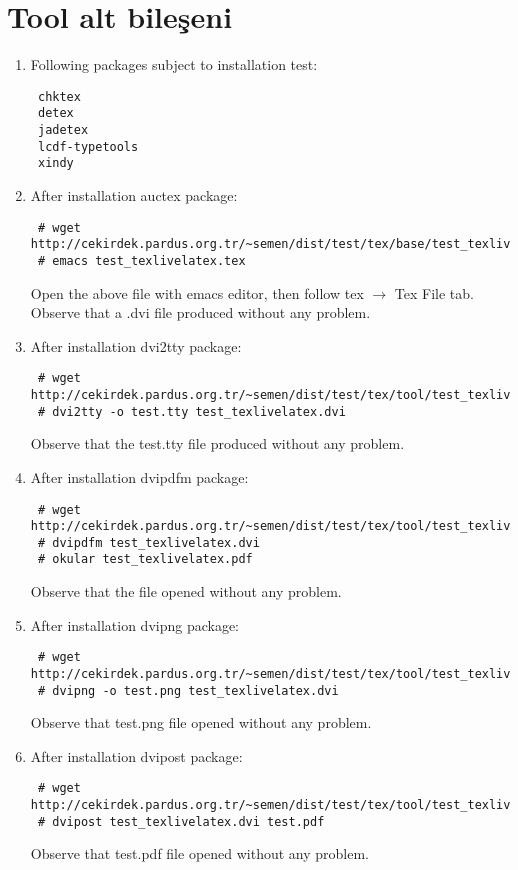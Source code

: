 \documentclass[a4paper,10pt]{article}
\begin{document}
\section{Tool alt bileşeni}
\begin{enumerate}
 \item Following packages subject to installation test:
\begin{verbatim}
 chktex
 detex
 jadetex
 lcdf-typetools
 xindy
\end{verbatim}

 \item After installation auctex package:
  
\begin{verbatim}
 # wget http://cekirdek.pardus.org.tr/~semen/dist/test/tex/base/test_texlivelatex.tex
 # emacs test_texlivelatex.tex 
\end{verbatim}

Open the above file with emacs editor, then follow tex $\rightarrow$ Tex File tab. Observe that a .dvi file produced without any problem.

 \item After installation dvi2tty package:
  
\begin{verbatim}
 # wget http://cekirdek.pardus.org.tr/~semen/dist/test/tex/tool/test_texlivelatex.dvi
 # dvi2tty -o test.tty test_texlivelatex.dvi
\end{verbatim}

Observe that the test.tty file produced without any problem.

\item After installation dvipdfm  package:
  
\begin{verbatim}
 # wget http://cekirdek.pardus.org.tr/~semen/dist/test/tex/tool/test_texlivelatex.dvi
 # dvipdfm test_texlivelatex.dvi
 # okular test_texlivelatex.pdf
\end{verbatim}

 Observe that the file opened without any problem.

\item After installation dvipng package:
 \begin{verbatim}
 # wget http://cekirdek.pardus.org.tr/~semen/dist/test/tex/tool/test_texlivelatex.dvi
 # dvipng -o test.png test_texlivelatex.dvi
 \end{verbatim}

 Observe that test.png file opened without any problem.
\item After installation dvipost package:
  \begin{verbatim}
 # wget http://cekirdek.pardus.org.tr/~semen/dist/test/tex/tool/test_texlivelatex.dvi
 # dvipost test_texlivelatex.dvi test.pdf
 \end{verbatim}
 Observe that test.pdf file opened without any problem.


\end{enumerate}
\end{document}
